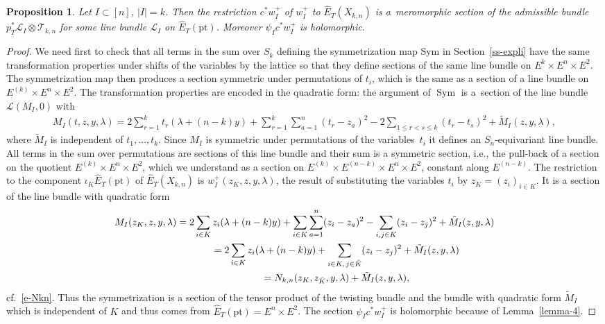 \documentclass[pdftex]{sigma}
\numberwithin{equation}{section}
\newtheorem{Proposition}[Theorem]{Proposition}
 { \theoremstyle{definition}
\newtheorem{Definition}[Theorem]{Definition}
\newtheorem{Example}[Theorem]{Example}
\newtheorem{Remark}[Theorem]{Remark} }
\begin{document}
\begin{Proposition}\label{prop-8} Let $I\subset[n]$, $|I|=k$. Then the restriction $c ^*w^+_I$ of $w^+_I$ to $\hat E_T(X_{k,n})$ is a~meromorphic section of the admissible bundle $p_T^*\mathcal L_I\otimes \mathcal T_{k,n}$ for some line bundle $\mathcal L_I$ on $\hat E_T(\mathrm{pt})$. Moreover $\psi_Ic ^*w^+_I$ is holomorphic.
\end{Proposition}
\begin{proof} We need first to check that all terms in the sum over $S_k$ defining the symmetrization map Sym in Section~\ref{ss-expli} have the same transformation properties under shifts of the variables by the lattice so that they define sections of the same line bundle on $E^k\times E^n\times E^2$. The symmetrization map then produces a section symmetric under permutations of $t_i$, which is the same as a section of a line bundle on
 $E^{(k)}\times E^n\times E^2$. The transformation properties are encoded in the quadratic form: the argument of $\operatorname{Sym}$ is a~section of the line bundle $\mathcal L(M_I,0)$ with
 \begin{gather*}
 M_I(t,z,y,\lambda) =2\sum_{r=1}^k t_r(\lambda+(n-k)y)+\!\sum_{r=1}^k\sum_{a=1}^n (t_r-z_a)^2-2\!\!\!\sum_{1\leq r<s\leq k}\!\!(t_r-t_s)^2 + \tilde M_I(z,y,\lambda),
 \end{gather*}
where $\tilde M_I$ is independent of $t_1,\dots,t_k$. Since $M_I$ is symmetric under permutations of the variables~$t_i$ it defines an $S_n$-equivariant line bundle. All terms in the sum over permutations are sections of this line bundle and their sum is a symmetric section, i.e., the pull-back of a section on the quotient $E^{(k)}\times E^n\times E^2$, which we understand as a section on $E^{(k)}\times E^{(n-k)}\times E^n\times E^2$, constant along $E^{(n-k)}$. The restriction to the component $\iota_K\hat E_T(\mathrm{pt})$ of $\hat E_T(X_{k,n})$ is $w^+_I(z_K,z,y,\lambda)$, the result of substituting the variables $t_i$ by $z_K=(z_i)_{i\in K}$. It is a section of the line bundle with quadratic form
 \begin{gather*}
 M_I(z_K,z,y,\lambda) = 2\sum_{i\in K}z_i(\lambda+(n-k)y) +\sum_{i\in K}\sum_{a=1}^n(z_i-z_a)^2 -\sum_{i,j\in K}(z_i-z_j)^2+\tilde M_I(z,y,\lambda)\\
\hphantom{M_I(z_K,z,y,\lambda)}{} =2\sum_{i\in K}z_i(\lambda+(n-k)y) +\sum_{i\in K,\, j\in\bar K}(z_i-z_j)^2 +\tilde M_I(z,y,\lambda)\\
\hphantom{M_I(z_K,z,y,\lambda)}{}= N_{k,n}(z_K,z_{\bar K},y,\lambda)+\tilde M_I(z,y,\lambda),
 \end{gather*}
 cf.~\eqref{e-Nkn}. Thus the symmetrization is a section of the tensor product of the twisting bundle and the bundle with quadratic form $\tilde M_I$ which is independent of $K$ and thus comes from $\hat E_T(\mathrm{pt})=E^n\times E^2$. The section $\psi_Ic ^*w^+_I$ is holomorphic because of Lemma~\ref{lemma-4}.
\end{proof}
\end{document}

